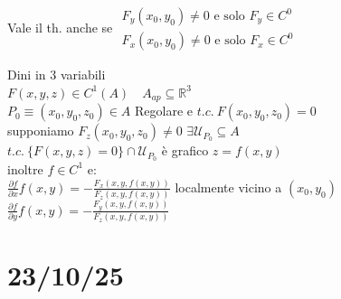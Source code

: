 \documentclass[a4paper, oneside]{article}
\begin{document}
\begin{observation}
    Vale il th. anche se $\begin{matrix}
        F_y(x_0,y_0) \neq 0 \text{ e solo } F_y \in C^0\\
        F_x(x_0,y_0) \neq 0 \text{ e solo } F_x \in C^0
    \end{matrix}$
\end{observation}
\begin{theorem}
    Dini in 3 variabili\\
    $F(x,y,z) \in C^1(A) \quad A_{ap} \subseteq \mathbb{R}^3$\\
    $P_0 \equiv (x_0,y_0,z_0) \in A$ Regolare e $t.c. \ F(x_0,y_0,z_0) = 0$\\
    supponiamo $F_z(x_0,y_0,z_0) \neq 0$   $\exists \mathcal{U}_{P_0} \subseteq A$\\
    $t.c. \ \{F(x,y,z) = 0\} \cap \mathcal{U}_{P_0}$ è grafico $z=f(x,y)$\\
    inoltre $f\in C^1$ e:\\
    $\frac{\partial f}{\partial x} f(x,y) = -\frac{F_x(x,y,f(x,y))}{F_z(x,y,f(x,y))}$ localmente vicino a $(x_0,y_0)$\\
    $\frac{\partial f}{\partial y} f(x,y) = -\frac{F_y(x,y,f(x,y))}{F_z(x,y,f(x,y))}$
\end{theorem}
\newpage
\section{23/10/25}
\end{document}
